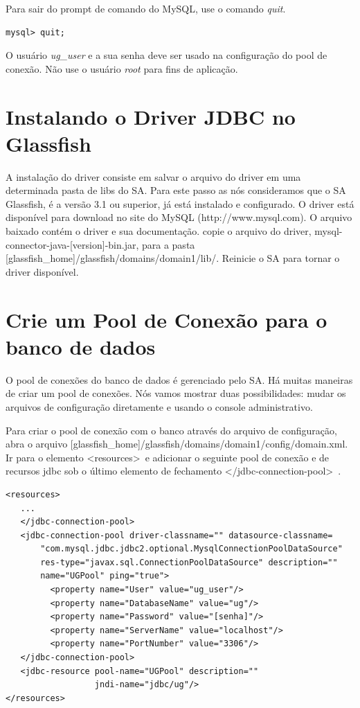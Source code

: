 \documentclass[envcountsame,envcountchap]{svmono}
\begin{document}
Para sair do prompt de comando do MySQL, use o comando \textit{quit}.

\begin{verbatim} 
mysql> quit;
\end{verbatim}

O usuário \textit{ug\_user} e a sua senha deve ser usado na configuração do pool de conexão. Não use o usuário \textit{root} para fins de aplicação.

\section{Instalando o Driver JDBC no Glassfish}

A instalação do driver consiste em salvar o arquivo do driver em uma determinada pasta de libs do SA. Para este passo as nós consideramos que o SA Glassfish, é a versão 3.1 ou superior, já está instalado e configurado. O driver está disponível para download no site do MySQL (http://www.mysql.com). O arquivo baixado contém o driver e sua documentação. copie o arquivo do driver, mysql-connector-java-[version]-bin.jar, para a pasta [glassfish\_home]/glassfish/domains/domain1/lib/. Reinicie o SA para tornar o driver disponível.

\section{Crie um Pool de Conexão para o banco de dados}
\label{sec:creating-database-connection-pool}

O pool de conexões do banco de dados é gerenciado pelo SA. Há muitas maneiras de criar um pool de conexões. Nós vamos mostrar duas possibilidades: mudar os arquivos de configuração diretamente e usando o console administrativo.

Para criar o pool de conexão com o banco através do arquivo de configuração, abra o arquivo [glassfish\_home]/glassfish/domains/domain1/config/domain.xml. Ir para o elemento \textless resources\textgreater \ e adicionar o seguinte pool de conexão e de recursos jdbc sob o último elemento de fechamento \textless /jdbc-connection-pool\textgreater \ .

\begin{verbatim}
<resources>
   ...
   </jdbc-connection-pool>
   <jdbc-connection-pool driver-classname="" datasource-classname=
       "com.mysql.jdbc.jdbc2.optional.MysqlConnectionPoolDataSource"
       res-type="javax.sql.ConnectionPoolDataSource" description="" 
       name="UGPool" ping="true">
         <property name="User" value="ug_user"/>
         <property name="DatabaseName" value="ug"/>
         <property name="Password" value="[senha]"/>
         <property name="ServerName" value="localhost"/>
         <property name="PortNumber" value="3306"/>
   </jdbc-connection-pool>
   <jdbc-resource pool-name="UGPool" description="" 
                  jndi-name="jdbc/ug"/>
</resources>
\end{verbatim}
\end{document}
